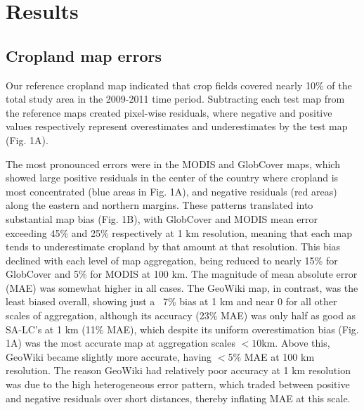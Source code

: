\documentclass[a4paper]{article}
\begin{document}
\section*{Results}
\vspace{-0.3 cm}
\subsection*{Cropland map errors}
\vspace{-0.2 cm}
Our reference cropland map indicated that crop fields covered nearly 10\% of the total study area in the 2009-2011 time period. Subtracting each test map from the reference maps created pixel-wise residuals, where negative and positive values respectively represent overestimates and underestimates by the test map (Fig. 1A).    

The most pronounced errors were in the MODIS and GlobCover maps, which showed large positive residuals in the center of the country where cropland is most concentrated (blue areas in Fig. 1A), and negative residuals (red areas) along the eastern and northern margins.
These patterns translated into substantial map bias (Fig. 1B), with GlobCover and MODIS mean error exceeding 45\% and 25\% respectively at 1 km resolution, meaning that each map tends to underestimate cropland by that amount at that resolution. This bias declined with each level of map aggregation, being reduced to nearly 15\% for GlobCover and 5\% for MODIS at 100 km. The magnitude of mean absolute error (MAE) was somewhat higher in all cases. The GeoWiki map, in contrast, was the least biased overall, showing just a ~7\% bias at 1 km and near 0 for all other scales of aggregation, although its accuracy (23\% MAE) was only half as good as SA-LC's at 1 km (11\% MAE), which despite its uniform overestimation bias (Fig. 1A) was the most accurate map at aggregation scales $<10$km. Above this, GeoWiki became slightly more accurate, having $<$5\% MAE at 100 km resolution. The reason GeoWiki had relatively poor accuracy at 1 km resolution was due to the high heterogeneous error pattern, which traded between positive and negative residuals over short distances, thereby inflating MAE at this scale.  
\end{document}
